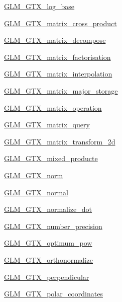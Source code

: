 \begin{DoxyCompactItemize}
\item 
\mbox{\hyperlink{group__gtx__log__base}{G\+L\+M\+\_\+\+G\+T\+X\+\_\+log\+\_\+base}}
\item 
\mbox{\hyperlink{group__gtx__matrix__cross__product}{G\+L\+M\+\_\+\+G\+T\+X\+\_\+matrix\+\_\+cross\+\_\+product}}
\item 
\mbox{\hyperlink{group__gtx__matrix__decompose}{G\+L\+M\+\_\+\+G\+T\+X\+\_\+matrix\+\_\+decompose}}
\item 
\mbox{\hyperlink{group__gtx__matrix__factorisation}{G\+L\+M\+\_\+\+G\+T\+X\+\_\+matrix\+\_\+factorisation}}
\item 
\mbox{\hyperlink{group__gtx__matrix__interpolation}{G\+L\+M\+\_\+\+G\+T\+X\+\_\+matrix\+\_\+interpolation}}
\item 
\mbox{\hyperlink{group__gtx__matrix__major__storage}{G\+L\+M\+\_\+\+G\+T\+X\+\_\+matrix\+\_\+major\+\_\+storage}}
\item 
\mbox{\hyperlink{group__gtx__matrix__operation}{G\+L\+M\+\_\+\+G\+T\+X\+\_\+matrix\+\_\+operation}}
\item 
\mbox{\hyperlink{group__gtx__matrix__query}{G\+L\+M\+\_\+\+G\+T\+X\+\_\+matrix\+\_\+query}}
\item 
\mbox{\hyperlink{group__gtx__matrix__transform__2d}{G\+L\+M\+\_\+\+G\+T\+X\+\_\+matrix\+\_\+transform\+\_\+2d}}
\item 
\mbox{\hyperlink{group__gtx__mixed__product}{G\+L\+M\+\_\+\+G\+T\+X\+\_\+mixed\+\_\+producte}}
\item 
\mbox{\hyperlink{group__gtx__norm}{G\+L\+M\+\_\+\+G\+T\+X\+\_\+norm}}
\item 
\mbox{\hyperlink{group__gtx__normal}{G\+L\+M\+\_\+\+G\+T\+X\+\_\+normal}}
\item 
\mbox{\hyperlink{group__gtx__normalize__dot}{G\+L\+M\+\_\+\+G\+T\+X\+\_\+normalize\+\_\+dot}}
\item 
\mbox{\hyperlink{group__gtx__number__precision}{G\+L\+M\+\_\+\+G\+T\+X\+\_\+number\+\_\+precision}}
\item 
\mbox{\hyperlink{group__gtx__optimum__pow}{G\+L\+M\+\_\+\+G\+T\+X\+\_\+optimum\+\_\+pow}}
\item 
\mbox{\hyperlink{group__gtx__orthonormalize}{G\+L\+M\+\_\+\+G\+T\+X\+\_\+orthonormalize}}
\item 
\mbox{\hyperlink{group__gtx__perpendicular}{G\+L\+M\+\_\+\+G\+T\+X\+\_\+perpendicular}}
\item 
\mbox{\hyperlink{group__gtx__polar__coordinates}{G\+L\+M\+\_\+\+G\+T\+X\+\_\+polar\+\_\+coordinates}}
\item 

\end{DoxyCompactItemize}

